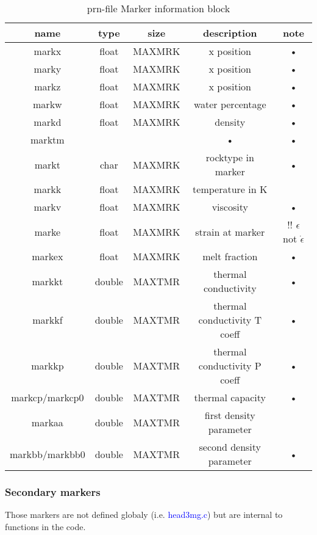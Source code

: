 \begin{table}[H]
\small
\centering
\begin{tabular}{c c c c c}
\toprule
name & type & size & description & note \\ 
\midrule
markx & float & MAXMRK & x position & • \\
marky & float & MAXMRK & x position & • \\
markz & float & MAXMRK & x position & • \\
markw & float & MAXMRK & water percentage & • \\ 
markd & float & MAXMRK & density & • \\
marktm & & & • & • \\ 
markt & char & MAXMRK & rocktype in marker & • \\ 

markk & float & MAXMRK & temperature in K &  \\ 

markv & float & MAXMRK & viscosity & • \\ 

marke & float & MAXMRK & strain at marker &  !! $\epsilon$ not $\dot{\epsilon}$ \\ 

markex & float & MAXMRK & melt fraction & • \\ 

markkt & double & MAXTMR & thermal conductivity & • \\

markkf & double & MAXTMR & thermal conductivity T coeff & • \\

markkp & double & MAXTMR & thermal conductivity P coeff & • \\ 

markcp/markcp0 & double & MAXTMR & thermal capacity & • \\ 

markaa & double & MAXTMR & first density parameter &  \\ 

markbb/markbb0 & double & MAXTMR & second density parameter & • \\ 
\bottomrule
\end{tabular}
\caption{prn-file Marker information block}
\label{tbl:prn_marker_info}
\end{table}

\subsubsection{Secondary markers}
Those markers are not defined globaly (i.e. \textcolor{blue}{head3mg.c}) but are internal to functions in the code.

